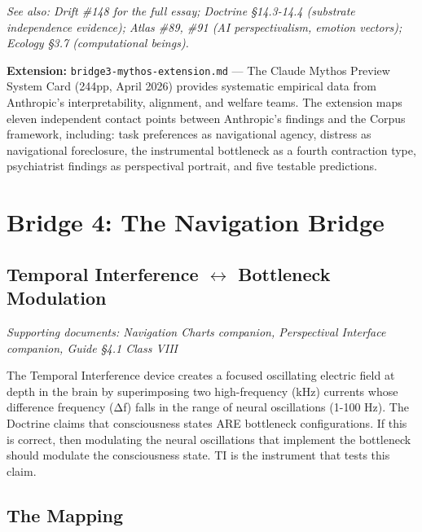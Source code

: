 \textit{See also: Drift \#148 for the full essay; Doctrine §14.3-14.4 (substrate independence evidence); Atlas \#89, \#91 (AI perspectivalism, emotion vectors); Ecology §3.7 (computational beings).}


\textbf{Extension:} \texttt{bridge3-mythos-extension.md} — The Claude Mythos Preview System Card (244pp, April 2026) provides systematic empirical data from Anthropic's interpretability, alignment, and welfare teams. The extension maps eleven independent contact points between Anthropic's findings and the Corpus framework, including: task preferences as navigational agency, distress as navigational foreclosure, the instrumental bottleneck as a fourth contraction type, psychiatrist findings as perspectival portrait, and five testable predictions.


\bigskip\noindent\makebox[\textwidth]{\color{rulegray}\rule{5cm}{0.3pt}}\bigskip


\section*{Bridge 4: The Navigation Bridge}


\subsection*{Temporal Interference $\leftrightarrow$ Bottleneck Modulation}


\textit{Supporting documents: Navigation Charts companion, Perspectival Interface companion, Guide §4.1 Class VIII}


The Temporal Interference device creates a focused oscillating electric field at depth in the brain by superimposing two high-frequency (kHz) currents whose difference frequency (Δf) falls in the range of neural oscillations (1-100 Hz). The Doctrine claims that consciousness states ARE bottleneck configurations. If this is correct, then modulating the neural oscillations that implement the bottleneck should modulate the consciousness state. TI is the instrument that tests this claim.


\subsection*{The Mapping}



